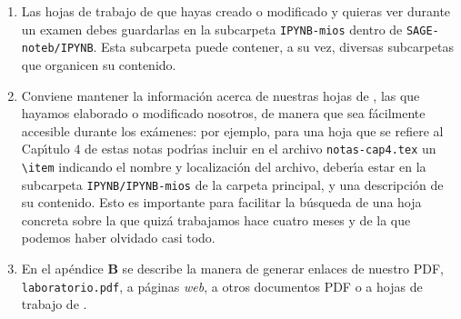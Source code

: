 \begin{appendices}
\begin{enumerate}
\begin{enumerate}
\item En esos documentos  \verb|notas-capn.tex| se puede escribir texto simple, 
pero para obtener un m\'{\i}nimo de legibilidad hay que escribir en \LaTeX, que
no es sino texto formateado,  como se explica en el ap\'endice siguiente. 

\item Para generar el PDF resultante, incluyendo las notas a\~nadidas, hay que compilar los archivos {\.tex} (ver Ap\'endice \ref{latex}-ref{TS}). 
\end{enumerate}

\item Las hojas de trabajo de {\sage} que hayas creado o modificado  y quieras
ver durante  un examen debes guardarlas en la subcarpeta \verb|IPYNB-mios| dentro de
\verb|SAGE-noteb/IPYNB|. Esta subcarpeta puede contener, a su vez, diversas subcarpetas que organicen su contenido.

\begin{comment}
\item Como se explica en la p\'agina \pageref{subir}, hay una manera r\'apida de
descargar todas las hojas que uno quiera en un \'unico archivo comprimido {\tt
zip} y luego subir el zip, las hojas que contiene, a otra copia de {\sage}. Esta
es la manera recomendada, ya que es la m\'as r\'apida,  de transferir nuestras
hojas a la copia de {\sage} que se usa durante los ex\'amenes.
\end{comment}
\item Conviene mantener la informaci\'on acerca de nuestras hojas de
{\sage}, las que hayamos elaborado o modificado nosotros,  de manera que sea
f\'acilmente accesible durante los ex\'amenes: por ejemplo, para una hoja que se
refiere al Cap\'{\i}tulo $4$ de estas notas podr\'{\i}as incluir en el archivo
\verb|notas-cap4.tex| un \verb|\item| indicando el nombre y
localizaci\'on del archivo, deber\'{\i}a estar en la subcarpeta \verb|IPYNB/IPYNB-mios|
de la
carpeta principal,  y una descripci\'on  de su contenido. Esto es
importante  para facilitar la b\'usqueda de una hoja concreta sobre la que
quiz\'a trabajamos hace cuatro meses y de la que podemos haber olvidado casi
todo.  



\item En el ap\'endice {\bf B} se describe la manera de generar enlaces de
nuestro PDF, \verb|laboratorio.pdf|, a p\'aginas {\itshape web},  a otros
documentos PDF o a hojas de trabajo de {\sage}. 











\end{enumerate}
\end{appendices}
